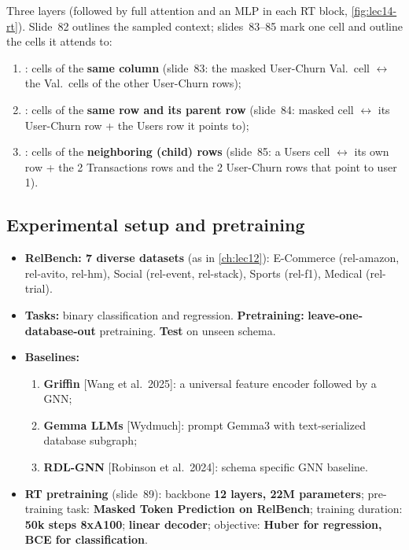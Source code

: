 Three  layers (followed by full attention and an MLP in each RT
block, \cref{fig:lec14-rt}). Slide~82 outlines the sampled context; slides~83--85 mark one
cell and outline the cells it attends to:
\begin{enumerate}
  \item {}: cells of the \textbf{same column} (slide~83: the masked
    User-Churn Val.\ cell $\leftrightarrow$ the Val.\ cells of the other User-Churn rows);
  \item {}: cells of the \textbf{same row and its parent row}
    (slide~84: masked cell $\leftrightarrow$ its User-Churn row + the Users row it points
    to);
  \item {}: cells of the \textbf{neighboring (child) rows} (slide~85:
    a Users cell $\leftrightarrow$ its own row + the 2 Transactions rows and the 2
    User-Churn rows that point to user 1).
\end{enumerate}

\subsection{Experimental setup and pretraining}\label{sec:lec14-rt-setup}

\begin{itemize}
  \item \textbf{RelBench: 7 diverse datasets} (as in \cref{ch:lec12}): E-Commerce
    (rel-amazon, rel-avito, rel-hm), Social (rel-event, rel-stack), Sports (rel-f1),
    Medical (rel-trial).
  \item \textbf{Tasks:} binary classification and regression. \textbf{Pretraining:}
    \textbf{leave-one-database-out} pretraining. \textbf{Test} on unseen schema.
  \item \textbf{Baselines:}
    \begin{enumerate}
      \item \textbf{Griffin} [Wang et al.\ 2025]: a universal feature encoder followed by a
        GNN;
      \item \textbf{Gemma LLMs} [Wydmuch]: prompt Gemma3 with text-serialized database
        subgraph;
      \item \textbf{RDL-GNN} [Robinson et al.\ 2024]: schema specific GNN baseline.
    \end{enumerate}
  \item \textbf{RT pretraining} (slide~89): backbone \textbf{12 layers, 22M parameters};
    pre-training task: \textbf{Masked Token Prediction on RelBench}; training duration:
    \textbf{50k steps 8xA100}; \textbf{linear decoder}; objective: \textbf{Huber for
    regression, BCE for classification}.
\end{itemize}

